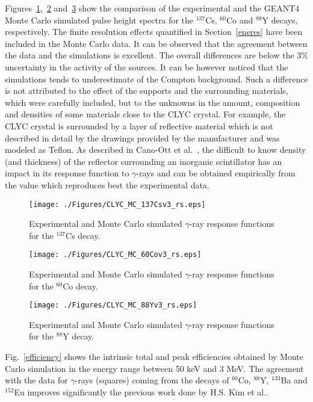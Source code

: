 \documentclass[review,number,sort&compress]{elsarticle}
\begin{document}
Figures~\ref{CsMCres},~\ref{CoMCres} and~\ref{YMCres} show the comparison of the experimental and the GEANT4 Monte Carlo simulated pulse height spectra for the $^{137}$Cs, $^{60}$Co and $^{88}$Y decays, respectively. The finite resolution effects quantified in Section~\ref{eneres} have been included in the Monte Carlo data. It can be observed that the agreement between the data and the simulations is excellent. The overall differences are below the 3$\%$ uncertainty in the activity of the sources. It can be however noticed that the simulations tends to underestimate of the Compton background. Such a difference is not attributed to the effect of the supports and the surrounding materials, which were carefully included, but to the unknowns in the amount, composition and densities of some materials close to the CLYC crystal. For example, the CLYC crystal is surrounded by a layer of reflective material which is not described in detail by the drawings provided by the manufacturer and was modeled as Teflon. As described in Cano-Ott et al.~\cite{Cano98}, the difficult to know density (and thickness) of the reflector surrounding an inorganic scintillator has an impact in its response function to $\gamma$-rays and can be obtained empirically from the value which reproduces best the experimental data.

\begin{figure}[h!]
\centering
\texttt{[image: ./Figures/CLYC\_MC\_137Csv3\_rs.eps]}
\caption{Experimental and Monte Carlo simulated $\gamma$-ray response functions for the $^{137}$Cs decay.}
\label{CsMCres}
\end{figure}

\begin{figure}[h!]
\centering
\texttt{[image: ./Figures/CLYC\_MC\_60Cov3\_rs.eps]}
\caption{Experimental and Monte Carlo simulated $\gamma$-ray response functions for the $^{60}$Co decay.}
\label{CoMCres}
\end{figure}

\begin{figure}[h!]
\centering
\texttt{[image: ./Figures/CLYC\_MC\_88Yv3\_rs.eps]}
\caption{Experimental and Monte Carlo simulated $\gamma$-ray response functions for the $^{88}$Y decay.}
\label{YMCres}
\end{figure}

Fig.~\ref{efficiency} shows the intrinsic total and peak efficiencies obtained by Monte Carlo simulation in the energy range between 50 keV and 3 MeV. The agreement with the data for $\gamma$-rays (squares) coming from the decays of $^{60}$Co, $^{88}$Y, $^{133}$Ba and $^{152}$Eu improves significantly the previous work done by H.S. Kim et al.\cite{Kim}.
\end{document}
